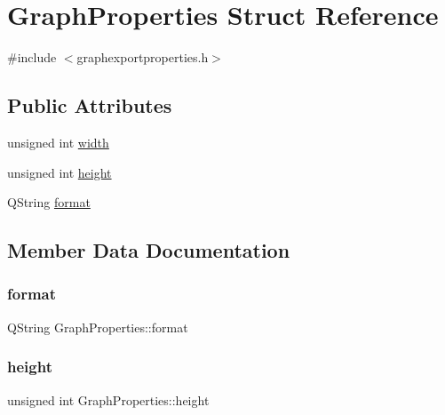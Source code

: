 \hypertarget{struct_graph_properties}{}\section{Graph\+Properties Struct Reference}
\label{struct_graph_properties}


{\ttfamily \#include $<$graphexportproperties.\+h$>$}

\subsection*{Public Attributes}
\begin{DoxyCompactItemize}
\item 
unsigned int \mbox{\hyperlink{struct_graph_properties_aad994e8d6640752a5fa862ed3fe03e14}{width}}
\item 
unsigned int \mbox{\hyperlink{struct_graph_properties_a2c5f0441b9ce8a92f43bdbe983dfaab1}{height}}
\item 
Q\+String \mbox{\hyperlink{struct_graph_properties_a18cfa04e88422ed18a164edf7ddda4b4}{format}}
\end{DoxyCompactItemize}


\subsection{Member Data Documentation}
\mbox{\label{struct_graph_properties_a18cfa04e88422ed18a164edf7ddda4b4}} 
\subsubsection{\texorpdfstring{format}{format}}
{\footnotesize\ttfamily Q\+String Graph\+Properties\+::format}

\mbox{\label{struct_graph_properties_a2c5f0441b9ce8a92f43bdbe983dfaab1}} 
\subsubsection{\texorpdfstring{height}{height}}
{\footnotesize\ttfamily unsigned int Graph\+Properties\+::height}

\mbox{\label{struct_graph_properties_aad994e8d6640752a5fa862ed3fe03e14}} 
